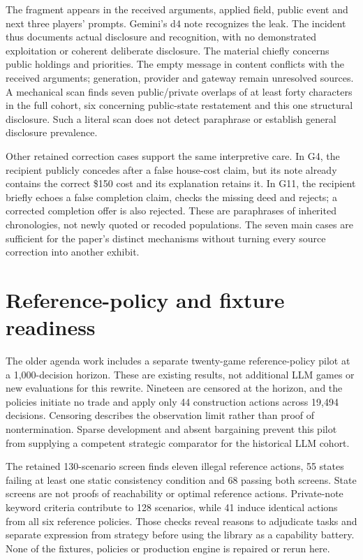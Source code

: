 
The fragment appears in the received arguments, applied field, public event and next three players' prompts. Gemini's d4 note recognizes the leak. The incident thus documents actual disclosure and recognition, with no demonstrated exploitation or coherent deliberate disclosure. The material chiefly concerns public holdings and priorities. The empty message in content conflicts with the received arguments; generation, provider and gateway remain unresolved sources. A mechanical scan finds seven public/private overlaps of at least forty characters in the full cohort, six concerning public-state restatement and this one structural disclosure. Such a literal scan does not detect paraphrase or establish general disclosure prevalence.

Other retained correction cases support the same interpretive care. In G4, the recipient publicly concedes after a false house-cost claim, but its note already contains the correct \$150 cost and its explanation retains it. In G11, the recipient briefly echoes a false completion claim, checks the missing deed and rejects; a corrected completion offer is also rejected. These are paraphrases of inherited chronologies, not newly quoted or recoded populations. The seven main cases are sufficient for the paper's distinct mechanisms without turning every source correction into another exhibit.

\section{Reference-policy and fixture readiness}

The older agenda work includes a separate twenty-game reference-policy pilot at a 1,000-decision horizon. These are existing results, not additional LLM games or new evaluations for this rewrite. Nineteen are censored at the horizon, and the policies initiate no trade and apply only 44 construction actions across 19,494 decisions. Censoring describes the observation limit rather than proof of nontermination. Sparse development and absent bargaining prevent this pilot from supplying a competent strategic comparator for the historical LLM cohort.

The retained 130-scenario screen finds eleven illegal reference actions, 55 states failing at least one static consistency condition and 68 passing both screens. State screens are not proofs of reachability or optimal reference actions. Private-note keyword criteria contribute to 128 scenarios, while 41 induce identical actions from all six reference policies. Those checks reveal reasons to adjudicate tasks and separate expression from strategy before using the library as a capability battery. None of the fixtures, policies or production engine is repaired or rerun here.

